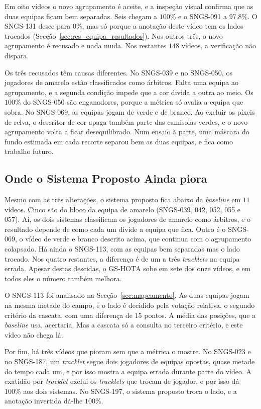 Em oito vídeos o novo agrupamento é aceite, e a inspeção visual confirma que as duas equipas ficam bem separadas. Seis chegam a $100\%$ e o SNGS-091 a $97.8\%$. O SNGS-131 desce para $0\%$, mas só porque a anotação deste vídeo tem os lados trocados (Secção~\ref{sec:res_equipa_resultados}). Nos outros três, o novo agrupamento é recusado e nada muda. Nos restantes $148$ vídeos, a verificação não dispara.

Os três recusados têm causas diferentes. No SNGS-039 e no SNGS-050, os jogadores de amarelo estão classificados como árbitros. Falta uma equipa ao agrupamento, e a segunda condição impede que a cor divida a outra ao meio. Os $100\%$ do SNGS-050 são enganadores, porque a métrica só avalia a equipa que sobra. No SNGS-069, as equipas jogam de verde e de branco. Ao excluir os píxeis de relva, o descritor de cor apaga também parte das camisolas verdes, e o novo agrupamento volta a ficar desequilibrado. Num ensaio à parte, uma máscara do fundo estimada em cada recorte separou bem as duas equipas, e fica como trabalho futuro.

\subsection{Onde o Sistema Proposto Ainda piora}\label{sec:res_equipa_regressoes}\label{sec:res_equipa_metrica}

Mesmo com as três alterações, o sistema proposto fica abaixo da \emph{baseline} em $11$ vídeos. Cinco são do bloco da equipa de amarelo (SNGS-039, 042, 052, 055 e 057). Aí, os dois sistemas classificam os jogadores de amarelo como árbitros, e o resultado depende de como cada um divide a equipa que fica. Outro é o SNGS-069, o vídeo de verde e branco descrito acima, que continua com o agrupamento colapsado. Há ainda o SNGS-113, com as equipas bem separadas mas o lado trocado. Nos quatro restantes, a diferença é de um a três \emph{tracklets} na equipa errada. Apesar destas descidas, o GS-HOTA sobe em sete dos onze vídeos, e em todos eles o número também melhora.

O SNGS-113 foi analisado na Secção~\ref{sec:mapeamento}. As duas equipas jogam na mesma metade do campo, e o lado é decidido pela votação relativa, o segundo critério da cascata, com uma diferença de $15$ pontos. A média das posições, que a \emph{baseline} usa, acertaria. Mas a cascata só a consulta no terceiro critério, e este vídeo não chega lá.

Por fim, há três vídeos que pioram sem que a métrica o mostre. No SNGS-023 e no SNGS-187, um \emph{tracklet} segue dois jogadores de equipas opostas, quase metade do tempo cada um, e por isso mostra a equipa errada durante parte do vídeo. A exatidão por \emph{tracklet} exclui os \emph{tracklets} que trocam de jogador, e por isso dá $100\%$ aos dois sistemas. No SNGS-197, o sistema proposto troca o lado, e a anotação invertida dá-lhe $100\%$.

